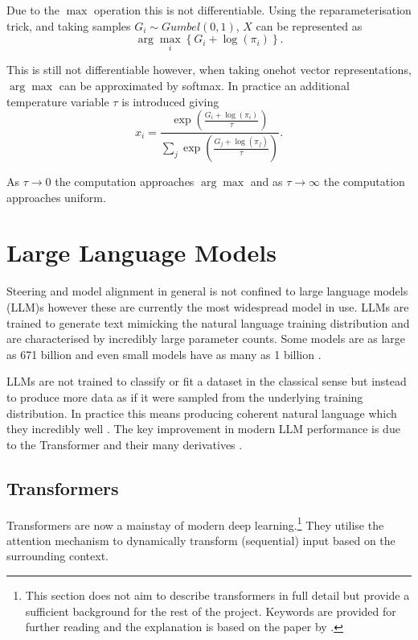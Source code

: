 Due to the $\max$ operation this is not differentiable.
Using the reparameterisation trick, and taking samples $G_i \sim Gumbel(0,1)$, $X$ can be represented as
\begin{equation*}
    \arg\max_i\left\{G_i + \log(\pi_i)\right\}.
\end{equation*}

This is still not differentiable however, when taking onehot vector representations, $\arg\max$ can be approximated by softmax.
In practice an additional temperature variable $\tau$ is introduced giving
\begin{equation*}
    x_i = \frac{\exp\left(\frac{G_i + \log(\pi_i)}{\tau}\right)}{\sum_{j}\exp\left(\frac{G_j + \log(\pi_j)}{\tau}\right)}.
\end{equation*}

As $\tau \to 0$ the computation approaches $\arg\max$ and as $\tau \to \infty$ the computation approaches uniform.

\section{Large Language Models}

Steering and model alignment in general is not confined to large language models (LLM)s however these are currently the most widespread model in use.
LLMs are trained to generate text mimicking the natural language training distribution and are characterised by incredibly large parameter counts.
Some models are as large as 671 billion \citep{deepseek} and even small models have as many as 1 billion \citep{gemma}.

LLMs are not trained to classify or fit a dataset in the classical sense but instead to produce more data as if it were sampled from the underlying training distribution.
In practice this means producing coherent natural language which they incredibly well \citep{c.ai}. The key improvement in modern LLM performance is due to the Transformer \citep{transformers} and their many derivatives \citep{linear-attention, bigbird, linformer}.

\subsection{Transformers}

Transformers \citep{transformers} are now a mainstay of modern deep learning.\footnote{This section does not aim to describe transformers in full detail but provide a sufficient background for the rest of the project.
Keywords are provided for further reading and the explanation is based on the paper by \citet{turner2023}.}
They utilise the attention mechanism to dynamically transform (sequential) input based on the surrounding context.

